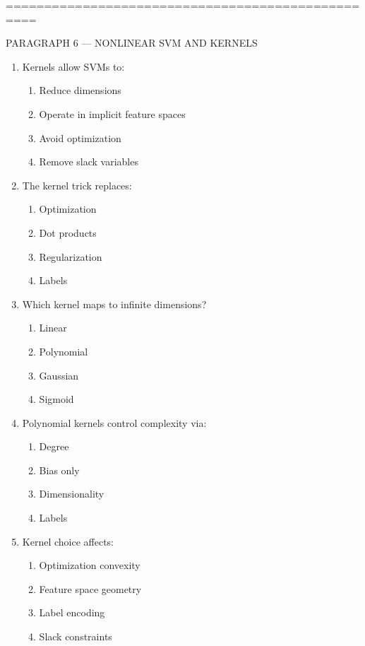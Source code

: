 \documentclass{article}
\begin{document}
	\bigskip
	==================================================
	
	PARAGRAPH 6 — NONLINEAR SVM AND KERNELS
	
	\begin{enumerate}
		\item Kernels allow SVMs to:
		\begin{enumerate}
			\item Reduce dimensions
			\item Operate in implicit feature spaces
			\item Avoid optimization
			\item Remove slack variables
		\end{enumerate}
		
		\item The kernel trick replaces:
		\begin{enumerate}
			\item Optimization
			\item Dot products
			\item Regularization
			\item Labels
		\end{enumerate}
		
		\item Which kernel maps to infinite dimensions?
		\begin{enumerate}
			\item Linear
			\item Polynomial
			\item Gaussian
			\item Sigmoid
		\end{enumerate}
		
		\item Polynomial kernels control complexity via:
		\begin{enumerate}
			\item Degree
			\item Bias only
			\item Dimensionality
			\item Labels
		\end{enumerate}
		
		\item Kernel choice affects:
		\begin{enumerate}
			\item Optimization convexity
			\item Feature space geometry
			\item Label encoding
			\item Slack constraints
		\end{enumerate}
		

\end{enumerate}
\end{document}
